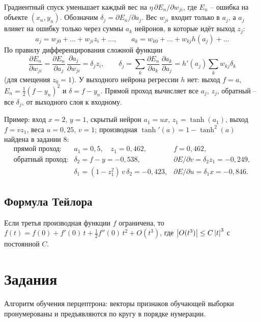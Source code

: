 \documentclass[12pt,a4paper]{article}
\begin{document}
Градиентный спуск уменьшает каждый вес на $\eta\,\partial E_n/\partial w_{ji}$,
где $E_n$ -- ошибка на объекте $(x_n, y_n)$. Обозначим
$\delta_j = \partial E_n/\partial a_j$. Вес $w_{ji}$ входит только в $a_j$, а $a_j$
влияет на ошибку только через суммы $a_k$ нейронов, в которые идёт выход $z_j$:
\[
  a_j = w_{j0} + \dots + w_{ji}z_i + \dots,
  \qquad
  a_k = w_{k0} + \dots + w_{kj}h(a_j) + \dots
\]
По правилу дифференцирования сложной функции
\begin{equation}\label{eq:backprop}
  \frac{\partial E_n}{\partial w_{ji}}
    = \frac{\partial E_n}{\partial a_j}\,\frac{\partial a_j}{\partial w_{ji}}
    = \delta_j z_i,
  \qquad
  \delta_j = \sum_k \frac{\partial E_n}{\partial a_k}\,\frac{\partial a_k}{\partial a_j}
           = h'(a_j)\sum_k w_{kj}\delta_k
\end{equation}
(для смещения $z_0 = 1$). У выходного нейрона регрессии $h$ нет: выход $f = a$,
$E_n = \frac12(f - y_n)^2$ и $\delta = f - y_n$. Прямой проход вычисляет все $a_j$,
$z_j$, обратный -- все $\delta_j$, от выходного слоя к входному.

Пример: вход $x = 2$, $y = 1$, скрытый нейрон $a_1 = ux$, $z_1 = \tanh(a_1)$, выход
$f = vz_1$, веса $u = 0{,}25$, $v = 1$; производная $\tanh'(a) = 1 - \tanh^2(a)$
найдена в задании 8:
\[
  \begin{array}{lll}
    \text{прямой проход:} & a_1 = 0{,}5, \quad z_1 = 0{,}462, & f = 0{,}462,\\[1mm]
    \text{обратный проход:} & \delta_2 = f - y = -0{,}538,
      & \partial E/\partial v = \delta_2 z_1 = -0{,}249,\\[1mm]
    & \delta_1 = (1 - z_1^2)\,v\,\delta_2 = -0{,}423,
      & \partial E/\partial u = \delta_1 x = -0{,}846 .
  \end{array}
\]

\subsection{Формула Тейлора}

Если третья производная функции $f$ ограничена, то
$f(t) = f(0) + f'(0)\,t + \frac12 f''(0)\,t^2 + O(t^3)$, где
$\left\lvert O(t^3) \right\rvert \le C\left\lvert t \right\rvert^3$ с постоянной $C$.

\section{Задания}

\dano Алгоритм обучения перцептрона: векторы признаков обучающей выборки
пронумерованы и предъявляются по кругу в порядке нумерации.
\end{document}
